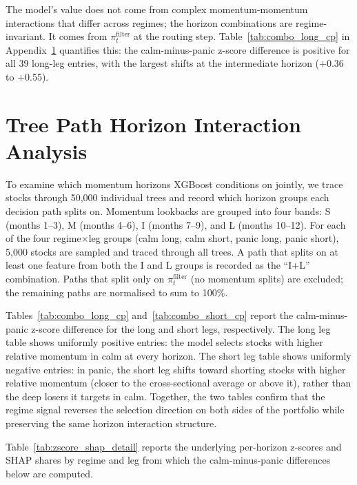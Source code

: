 The model's value does not come from complex momentum-momentum interactions that differ across regimes; the horizon combinations are regime-invariant. It comes from $\pi_t^{\text{filter}}$ at the routing step. Table~\ref{tab:combo_long_cp} in Appendix~\ref{app:combo_analysis} quantifies this: the calm-minus-panic z-score difference is positive for all 39 long-leg entries, with the largest shifts at the intermediate horizon ($+$0.36 to $+$0.55).


\section{Tree Path Horizon Interaction Analysis}\label{app:combo_analysis}

To examine which momentum horizons XGBoost conditions on jointly, we trace stocks through 50{,}000 individual trees and record which horizon groups each decision path splits on. Momentum lookbacks are grouped into four bands: S (months 1--3), M (months 4--6), I (months 7--9), and L (months 10--12). For each of the four regime$\times$leg groups (calm long, calm short, panic long, panic short), 5{,}000 stocks are sampled and traced through all trees. A path that splits on at least one feature from both the I and L groups is recorded as the ``I{+}L'' combination. Paths that split only on $\pi_t^{\text{filter}}$ (no momentum splits) are excluded; the remaining paths are normalised to sum to 100\%.

Tables~\ref{tab:combo_long_cp} and~\ref{tab:combo_short_cp} report the calm-minus-panic z-score difference for the long and short legs, respectively. The long leg table shows uniformly positive entries: the model selects stocks with higher relative momentum in calm at every horizon. The short leg table shows uniformly negative entries: in panic, the short leg shifts toward shorting stocks with higher relative momentum (closer to the cross-sectional average or above it), rather than the deep losers it targets in calm. Together, the two tables confirm that the regime signal reverses the selection direction on both sides of the portfolio while preserving the same horizon interaction structure.

Table~\ref{tab:zscore_shap_detail} reports the underlying per-horizon z-scores and SHAP shares by regime and leg from which the calm-minus-panic differences below are computed.






